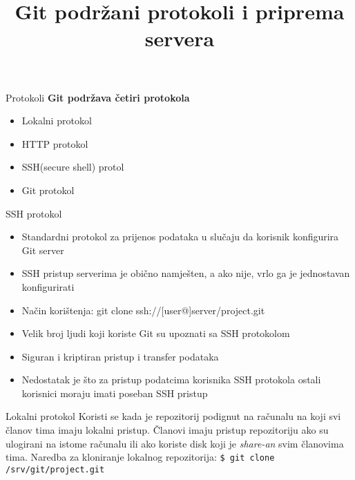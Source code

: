 \documentclass[10pt]{beamer}
\title{Git podržani protokoli i priprema servera}
\begin{document}
	\begin{frame}
		\maketitle	

	\end{frame}

	\begin{frame}{\centering Protokoli}
		\textbf{Git podržava četiri protokola}
		\begin{itemize}
			\item Lokalni protokol
			\item HTTP protokol
			\item SSH(secure shell) protol
			\item Git protokol
		\end{itemize}
	\end{frame}

	\begin{frame}{SSH protokol}
		\begin{itemize}
			

			\item Standardni protokol za prijenos podataka u slučaju da korisnik konfigurira Git server
			\item SSH pristup serverima je obično namješten, a ako nije, vrlo ga je jednostavan konfigurirati
			\item Način korištenja:    git clone ssh://[user@]server/project.git 
			\item Velik broj ljudi koji koriste Git su upoznati sa SSH protokolom 
			\item Siguran i kriptiran pristup i transfer podataka
			\item Nedostatak je što za pristup podatcima korisnika SSH protokola ostali korisnici moraju imati poseban SSH pristup  
		
		\end{itemize}		
	\end{frame}

	\begin{frame}[fragile]{Lokalni protokol}
		Koristi se kada je repozitorij podignut na računalu na koji svi članov tima imaju lokalni pristup.
		Članovi imaju pristup repozitoriju ako su ulogirani na istome računalu ili ako koriste disk koji je \textit{share-an} svim članovima tima.
		\newline \newline
		Naredba za kloniranje lokalnog repozitorija: \verb|$ git clone /srv/git/project.git|
		
	\end{frame}
\end{document}
